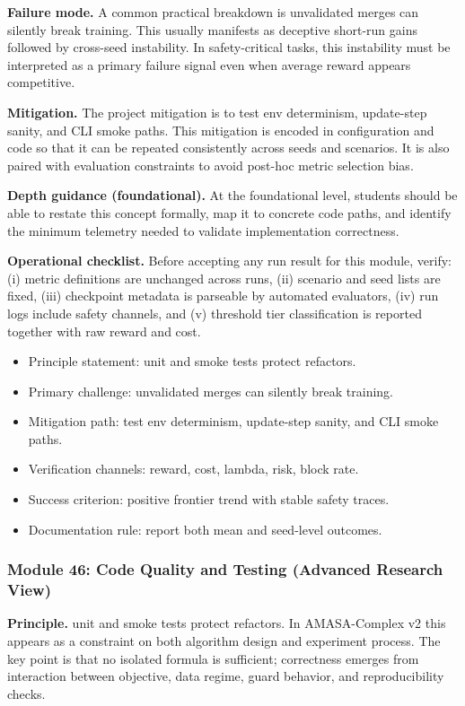 \documentclass[conference]{IEEEtran}
\begin{document}
\textbf{Failure mode.} A common practical breakdown is unvalidated merges can silently break training. This usually manifests as deceptive short-run gains followed by cross-seed instability. In safety-critical tasks, this instability must be interpreted as a primary failure signal even when average reward appears competitive.

\textbf{Mitigation.} The project mitigation is to test env determinism, update-step sanity, and CLI smoke paths. This mitigation is encoded in configuration and code so that it can be repeated consistently across seeds and scenarios. It is also paired with evaluation constraints to avoid post-hoc metric selection bias.

\textbf{Depth guidance (foundational).} At the foundational level, students should be able to restate this concept formally, map it to concrete code paths, and identify the minimum telemetry needed to validate implementation correctness.

\textbf{Operational checklist.} Before accepting any run result for this module, verify: (i) metric definitions are unchanged across runs, (ii) scenario and seed lists are fixed, (iii) checkpoint metadata is parseable by automated evaluators, (iv) run logs include safety channels, and (v) threshold tier classification is reported together with raw reward and cost.

\begin{itemize}[leftmargin=*]
  \item Principle statement: unit and smoke tests protect refactors.
  \item Primary challenge: unvalidated merges can silently break training.
  \item Mitigation path: test env determinism, update-step sanity, and CLI smoke paths.
  \item Verification channels: reward, cost, lambda, risk, block rate.
  \item Success criterion: positive frontier trend with stable safety traces.
  \item Documentation rule: report both mean and seed-level outcomes.
\end{itemize}


\subsubsection{Module 46: Code Quality and Testing (Advanced Research View)}
\textbf{Principle.} unit and smoke tests protect refactors. In AMASA-Complex v2 this appears as a constraint on both algorithm design and experiment process. The key point is that no isolated formula is sufficient; correctness emerges from interaction between objective, data regime, guard behavior, and reproducibility checks.
\end{document}
